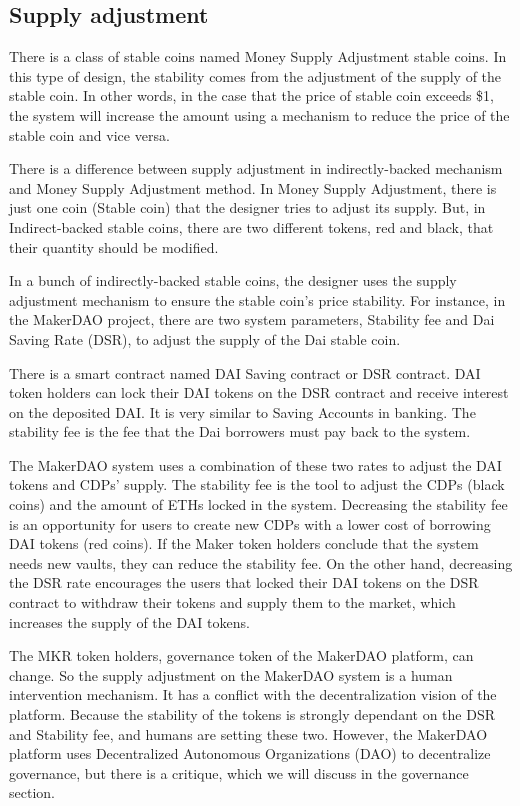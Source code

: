 \subsection{Supply adjustment}
There is a class of stable coins named Money Supply Adjustment stable coins. In this type of design, the stability comes from the adjustment of the supply of the stable coin. In other words, in the case that the price of stable coin exceeds \$1, the system will increase the amount using a mechanism to reduce the price of the stable coin and vice versa. 

There is a difference between supply adjustment in indirectly-backed mechanism and Money Supply Adjustment method. In Money Supply Adjustment, there is just one coin (Stable coin) that the designer tries to adjust its supply. But, in Indirect-backed stable coins, there are two different tokens, red and black, that their quantity should be modified.

 In a bunch of indirectly-backed stable coins, the designer uses the supply adjustment mechanism to ensure the stable coin's price stability. For instance, in the MakerDAO project, there are two system parameters, Stability fee and Dai Saving Rate (DSR), to adjust the supply of the Dai stable coin.

There is a smart contract named DAI Saving contract or DSR contract. DAI token holders can lock their DAI tokens on the DSR contract and receive interest on the deposited DAI. It is very similar to Saving Accounts in banking. 
The stability fee is the fee that the Dai borrowers must pay back to the system. 

The MakerDAO system uses a combination of these two rates to adjust the DAI tokens and CDPs' supply. The stability fee is the tool to adjust the CDPs (black coins) and the amount of ETHs locked in the system. Decreasing the stability fee is an opportunity for users to create new CDPs with a lower cost of borrowing DAI tokens (red coins). If the Maker token holders conclude that the system needs new vaults, they can reduce the stability fee.
On the other hand, decreasing the DSR rate encourages the users that locked their DAI tokens on the DSR contract to withdraw their tokens and supply them to the market, which increases the supply of the DAI tokens.

The MKR token holders, governance token of the MakerDAO platform, can change. So the supply adjustment on the MakerDAO system is a human intervention mechanism. It has a conflict with the decentralization vision of the platform. Because the stability of the tokens is strongly dependant on the DSR and Stability fee, and humans are setting these two. However, the MakerDAO platform uses Decentralized Autonomous Organizations (DAO) to decentralize governance, but there is a critique, which we will discuss in the governance section.

